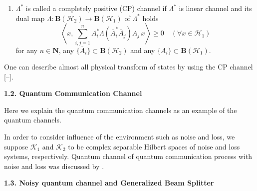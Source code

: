 \begin{enumerate}
\item[(2)]  $  \Lambda ^{\ast } $    is called a completely positive (CP) channel
if  $  \Lambda ^{\ast } $    is linear channel and its dual map  $  \Lambda :\mathbf{B%
}(\mathcal{H}_{2})\rightarrow \mathbf{B}(\mathcal{H}_{1}) $    of  $  \Lambda
^{\ast } $   holds 
\[
\left\langle x,\sum_{i,j=1}^{n}A_{i}^{\ast }\Lambda (\overline{A}_{i}^{\ast }%
\overline{A}_{j})A_{j}\,x\right\rangle \geq 0\quad \left( \forall x\in 
\mathcal{H}_{1}\right) 
\]%
for any  $  n\in \mathbf{N} $,   any  $  \{\overline{A}_{i}\}\subset \mathbf{B}(%
\mathcal{H}_{2}) $   and any  $  \{A_{i}\}\subset \mathbf{B}(\mathcal{H}_{1}) $.
\end{enumerate}

One can describe almost all physical transform of states by using the CP
channel [--].

\smallskip

\textbf{1.2. Quantum Communication Channel}

Here we explain the quantum communication channels as an example of the
quantum channels.   

In order to consider influence of the environment such as noise and loss, we
suppose  $  \mathcal{K}_{1} $   and  $  \mathcal{K}_{2} $   to be complex separable
Hilbert spaces of noise and loss systems, respectively. Quantum channel of
quantum communication process with noise and loss was discussed by \cite{nv:-O1,nv:-OW3}.

\smallskip

\textbf{1.3. Noisy quantum channel and Generalized Beam Splitter}



